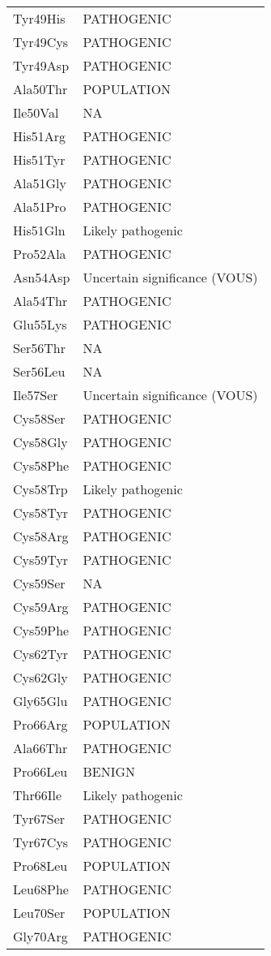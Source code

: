 \begin{tiny}
\begin{longtable}[l]{l|l}
	Tyr49His & PATHOGENIC \\
	Tyr49Cys & PATHOGENIC \\
	Tyr49Asp & PATHOGENIC \\
	Ala50Thr & POPULATION \\
	Ile50Val & NA \\
	His51Arg & PATHOGENIC \\
	His51Tyr & PATHOGENIC \\
	Ala51Gly & PATHOGENIC \\
	Ala51Pro & PATHOGENIC \\
	His51Gln & Likely pathogenic \\
	Pro52Ala & PATHOGENIC \\
	Asn54Asp & Uncertain significance (VOUS) \\
	Ala54Thr & PATHOGENIC \\
	Glu55Lys & PATHOGENIC \\
	Ser56Thr & NA \\
	Ser56Leu & NA \\
	Ile57Ser & Uncertain significance (VOUS) \\
	Cys58Ser & PATHOGENIC \\
	Cys58Gly & PATHOGENIC \\
	Cys58Phe & PATHOGENIC \\
	Cys58Trp & Likely pathogenic \\
	Cys58Tyr & PATHOGENIC \\
	Cys58Arg & PATHOGENIC \\
	Cys59Tyr & PATHOGENIC \\
	Cys59Ser & NA \\
	Cys59Arg & PATHOGENIC \\
	Cys59Phe & PATHOGENIC \\
	Cys62Tyr & PATHOGENIC \\
	Cys62Gly & PATHOGENIC \\
	Gly65Glu & PATHOGENIC \\
	Pro66Arg & POPULATION \\
	Ala66Thr & PATHOGENIC \\
	Pro66Leu & BENIGN \\
	Thr66Ile & Likely pathogenic \\
	Tyr67Ser & PATHOGENIC \\
	Tyr67Cys & PATHOGENIC \\
	Pro68Leu & POPULATION \\
	Leu68Phe & PATHOGENIC \\
	Leu70Ser & POPULATION \\
	Gly70Arg & PATHOGENIC \\

\end{longtable}
\end{tiny}
